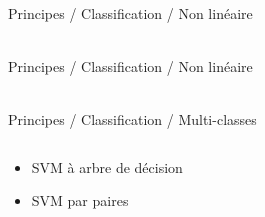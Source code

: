 \begin{frame}{\bititle\\Principes / Classification / Non linéaire}
\begin{center}



\end{center}
\end{frame}
\begin{frame}{\bititle\\Principes / Classification / Non linéaire}
\begin{center}


\end{center}
\end{frame}
\begin{frame}{\bititle\\Principes / Classification / Multi-classes}
\begin{columns}\begin{column}{.5\textwidth}

\begin{itemize}
\item<1-> SVM à arbre de décision
\item<2-> SVM par paires
\end{itemize}

\end{column}\begin{column}{.5\textwidth}


\end{column}\end{columns}
\end{frame}
